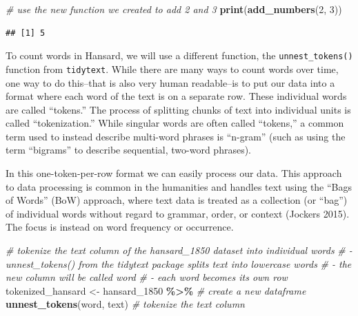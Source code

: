 \documentclass[
]{article}
\newenvironment{Shaded}{\begin{snugshade}}{\end{snugshade}}
\newcommand{\CommentTok}[1]{\textcolor[rgb]{0.56,0.35,0.01}{\textit{#1}}}
\newcommand{\DecValTok}[1]{\textcolor[rgb]{0.00,0.00,0.81}{#1}}
\newcommand{\FunctionTok}[1]{\textcolor[rgb]{0.13,0.29,0.53}{\textbf{#1}}}
\newcommand{\NormalTok}[1]{#1}
\newcommand{\OtherTok}[1]{\textcolor[rgb]{0.56,0.35,0.01}{#1}}
\newcommand{\SpecialCharTok}[1]{\textcolor[rgb]{0.81,0.36,0.00}{\textbf{#1}}}
\begin{document}
\begin{Shaded}
\begin{Highlighting}[]
\CommentTok{\# use the new function we created to add 2 and 3}
\FunctionTok{print}\NormalTok{(}\FunctionTok{add\_numbers}\NormalTok{(}\DecValTok{2}\NormalTok{, }\DecValTok{3}\NormalTok{))}
\end{Highlighting}
\end{Shaded}

\begin{verbatim}
## [1] 5
\end{verbatim}

To count words in Hansard, we will use a different function, the
\texttt{unnest\_tokens()} function from \texttt{tidytext}. While there
are many ways to count words over time, one way to do this--that is also
very human readable--is to put our data into a format where each word of
the text is on a separate row. These individual words are called
``tokens.'' The process of splitting chunks of text into individual
units is called ``tokenization.'' While singular words are often called
``tokens,'' a common term used to instead describe multi-word phrases is
``n-gram'' (such as using the term ``bigrams'' to describe sequential,
two-word phrases).

In this one-token-per-row format we can easily process our data. This
approach to data processing is common in the humanities and handles text
using the ``Bags of Words'' (BoW) approach, where text data is treated
as a collection (or ``bag'') of individual words without regard to
grammar, order, or context (Jockers 2015). The focus is instead on word
frequency or occurrence.

\begin{Shaded}
\begin{Highlighting}[]
\CommentTok{\# tokenize the \textquotesingle{}text\textquotesingle{} column of the hansard\_1850 dataset into individual words}
\CommentTok{\# {-} \textquotesingle{}unnest\_tokens()\textquotesingle{} from the \textquotesingle{}tidytext\textquotesingle{} package splits text into lowercase words}
\CommentTok{\# {-} the new column will be called \textquotesingle{}word\textquotesingle{}}
\CommentTok{\# {-} each word becomes its own row }
\NormalTok{tokenized\_hansard }\OtherTok{\textless{}{-}}\NormalTok{ hansard\_1850 }\SpecialCharTok{\%\textgreater{}\%} \CommentTok{\# create a new dataframe}
  \FunctionTok{unnest\_tokens}\NormalTok{(word, text) }\CommentTok{\# tokenize the \textquotesingle{}text\textquotesingle{} column }
\end{Highlighting}
\end{Shaded}
\end{document}

